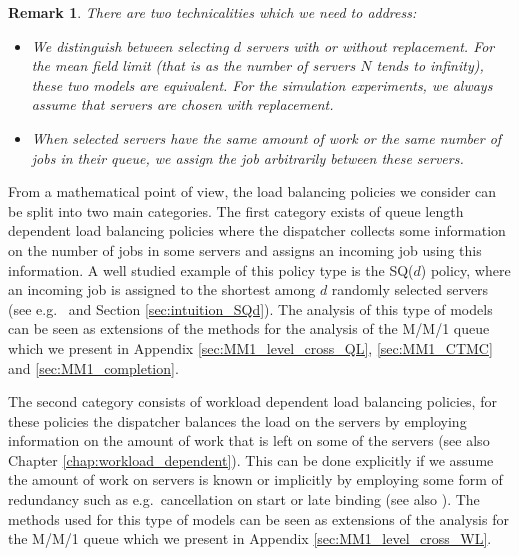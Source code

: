 \documentclass[12pt]{report}
\newtheorem{remark}{Remark}
\begin{document}
\begin{remark}
	There are two technicalities which we need to address:
	\begin{itemize}
		\item We distinguish between selecting $d$ servers with or without replacement. For the mean field limit (that is as the number of servers $N$ tends to infinity), these two models are equivalent. For the simulation experiments, we always assume that servers are chosen with replacement.
		\item When selected servers have the same amount of work or the same number of jobs in their queue, we assign the job arbitrarily between these servers.
	\end{itemize}
\end{remark}
From a mathematical point of view, the load balancing policies we consider can be split into two main categories. The first category exists of queue length dependent load balancing policies where the dispatcher collects some information on the number of jobs in some servers and assigns an incoming job using this information. A well studied example of this policy type is the SQ($d$) policy, where an incoming job is assigned to the shortest among $d$ randomly selected servers (see e.g.~\cite{mitzenmacher4, vvedenskaya3} and Section \ref{sec:intuition_SQd}). The analysis of this type of models can be seen as extensions of the methods for the analysis of the M/M/1 queue which we present in Appendix \ref{sec:MM1_level_cross_QL}, \ref{sec:MM1_CTMC} and \ref{sec:MM1_completion}.

The second category consists of workload dependent load balancing policies, for these policies the dispatcher balances the load on the servers by employing information on the amount of work that is left on some of the servers (see also Chapter \ref{chap:workload_dependent}). This can be done explicitly if we assume the amount of work on servers is known or implicitly by employing some form of redundancy such as e.g.~cancellation on start or late binding (see also \cite{ousterhout2013sparrow}). The methods used for this type of models can be seen as extensions of the analysis for the M/M/1 queue which we present in Appendix \ref{sec:MM1_level_cross_WL}.
\end{document}
